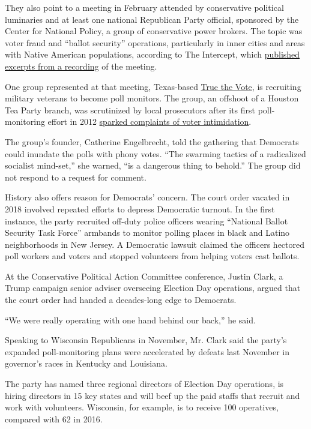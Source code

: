 They also point to a meeting in February attended by conservative
political luminaries and at least one national Republican Party
official, sponsored by the Center for National Policy, a group of
conservative power brokers. The topic was voter fraud and ``ballot
security'' operations, particularly in inner cities and areas with
Native American populations, according to The Intercept, which
\href{https://theintercept.com/2020/04/11/republican-poll-watchers-vote-by-mail-voter-fraud/?ref=hvper.com}{published
excerpts from a recording} of the meeting.

One group represented at that meeting, Texas-based
\href{https://truethevote.org/}{True the Vote}, is recruiting military
veterans to become poll monitors. The group, an offshoot of a Houston
Tea Party branch, was scrutinized by local prosecutors after its first
poll-monitoring effort in 2012
\href{https://www.theatlantic.com/magazine/archive/2012/10/the-ballot-cops/309085/}{sparked
complaints of voter intimidation}.

The group's founder, Catherine Engelbrecht, told the gathering that
Democrats could inundate the polls with phony votes. ``The swarming
tactics of a radicalized socialist mind-set,'' she warned, ``is a
dangerous thing to behold.'' The group did not respond to a request for
comment.

History also offers reason for Democrats' concern. The court order
vacated in 2018 involved repeated efforts to depress Democratic turnout.
In the first instance, the party recruited off-duty police officers
wearing ``National Ballot Security Task Force'' armbands to monitor
polling places in black and Latino neighborhoods in New Jersey. A
Democratic lawsuit claimed the officers hectored poll workers and voters
and stopped volunteers from helping voters cast ballots.

At the Conservative Political Action Committee conference, Justin Clark,
a Trump campaign senior adviser overseeing Election Day operations,
argued that the court order had handed a decades-long edge to Democrats.

``We were really operating with one hand behind our back,'' he said.

Speaking to Wisconsin Republicans in November, Mr. Clark said the
party's expanded poll-monitoring plans were accelerated by defeats last
November in governor's races in Kentucky and Louisiana.

The party has named three regional directors of Election Day operations,
is hiring directors in 15 key states and will beef up the paid staffs
that recruit and work with volunteers. Wisconsin, for example, is to
receive 100 operatives, compared with 62 in 2016.

